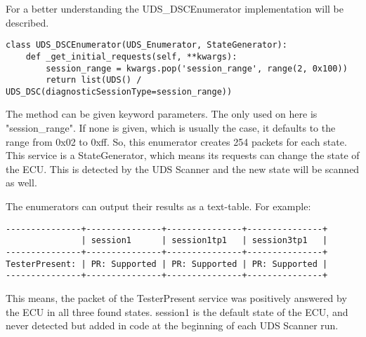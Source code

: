 For a better understanding the UDS\_DSCEnumerator implementation will be described.

\begin{samepage}
\begin{verbatim}
class UDS_DSCEnumerator(UDS_Enumerator, StateGenerator):
    def _get_initial_requests(self, **kwargs):
        session_range = kwargs.pop('session_range', range(2, 0x100))
        return list(UDS() / UDS_DSC(diagnosticSessionType=session_range))
\end{verbatim}
\end{samepage}

The method can be given keyword parameters. The only used on here is "session\_range". If none is given, which is usually the case, it defaults to the range from 0x02 to 0xff. So, this enumerator creates 254 packets for each state. This service is a StateGenerator, which means its requests can change the state of the ECU. This is detected by the UDS Scanner and the new state will be scanned as well.


The enumerators can output their results as a text-table. For example:

\begin{samepage}
\begin{verbatim}
---------------+---------------+---------------+---------------+
               | session1      | session1tp1   | session3tp1   | 
---------------+---------------+---------------+---------------+
TesterPresent: | PR: Supported | PR: Supported | PR: Supported | 
---------------+---------------+---------------+---------------+
\end{verbatim}
\end{samepage}

This means, the packet of the TesterPresent service was positively answered by the ECU in all three found states. session1 is the default state of the ECU, and never detected but added in code at the beginning of each UDS Scanner run.
